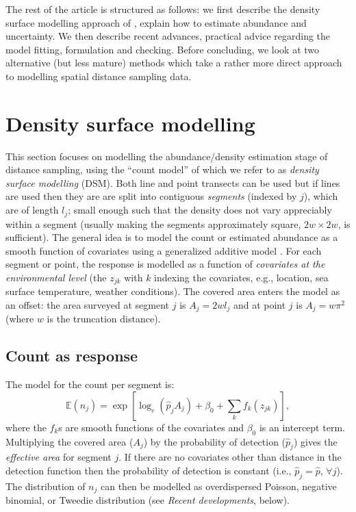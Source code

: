 \documentclass[a4paper,12pt]{article}
\begin{document}
The rest of the article is structured as follows: we first describe the density surface modelling approach of \cite{Hedley:2004et}, explain how to estimate abundance and uncertainty. We then describe recent advances, practical advice regarding the model fitting, formulation and checking. Before concluding, we look at two alternative (but less mature) methods which take a rather more direct approach to modelling spatial distance sampling data.


\section*{Density surface modelling}
\label{s:dsm}

This section focuses on modelling the abundance/density estimation stage of distance sampling, using the ``count model'' of \cite{Hedley:2004et} which we refer to as \textit{density surface modelling} (DSM). Both line and point transects can be used but if lines are used then they are are split into contiguous \textit{segments} (indexed by $j$), which are of length $l_j$; small enough such that the density does not vary appreciably within a segment (usually making the segments approximately square, $2w\times 2w$, is sufficient). The general idea is to model the count or estimated abundance as a smooth function of covariates using a generalized additive model \cite[GAM;][]{Wood:2006wz}. For each segment or point, the response is modelled as a function of \textit{covariates at the environmental level} (the $z_{jk}$ with $k$ indexing the covariates, e.g., location, sea surface temperature, weather conditions). The covered area enters the model as an offset: the area surveyed at segment $j$ is $A_j = 2wl_j$ and at point $j$ is $A_j=w\pi^2$ (where $w$ is the truncation distance). 

\subsection*{Count as response}

The model for the count per segment is:
\begin{equation*}
\mathbb{E}(n_j) = \exp\left[ \log_e \left( \hat{p}_j A_j \right) + \beta_0 + \sum_k f_k\left(z_{jk}\right) \right],
\end{equation*}
where the $f_k$s are smooth functions of the covariates and $\beta_0$ is an intercept term. Multiplying the covered area ($A_j$) by the probability of detection ($\hat{p}_j$) gives the \textit{effective area} for segment $j$. If there are no covariates other than distance in the detection function then the probability of detection is constant (i.e., $\hat{p}_j=\hat{p}$, $\forall j$). The distribution of $n_j$ can then be modelled as overdispersed Poisson, negative binomial, or Tweedie distribution (see \textit{Recent developments}, below).
\end{document}
